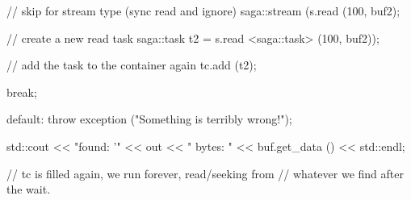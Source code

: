 \begin{mycode}
{{         // skip for stream type (sync read and ignore)
         saga::stream (s.read (100, buf2);
 
         // create a new read task
         saga::task t2 = s.read <saga::task> (100, buf2));
 
         // add the task to the container again
         tc.add (t2);
 
         break;
 
       default:
         throw exception ("Something is terribly wrong!");
     }
 
     std::cout << "found: '" << out << " bytes: " 
                             << buf.get_data () 
                             << std::endl;
 
     // tc is filled again, we run forever, read/seeking from
     // whatever we find after the wait.
  }
 \end{mycode}
 
 
 
 
